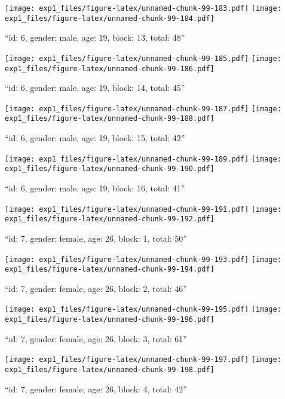 \documentclass[,]{article}
\begin{document}
\texttt{[image: exp1\_files/figure-latex/unnamed-chunk-99-183.pdf]}
\texttt{[image: exp1\_files/figure-latex/unnamed-chunk-99-184.pdf]}

\newpage
[1] 

``id: 6, gender: male, age: 19, block: 13, total: 48''

\texttt{[image: exp1\_files/figure-latex/unnamed-chunk-99-185.pdf]}
\texttt{[image: exp1\_files/figure-latex/unnamed-chunk-99-186.pdf]}

\newpage
[1] 

``id: 6, gender: male, age: 19, block: 14, total: 45''

\texttt{[image: exp1\_files/figure-latex/unnamed-chunk-99-187.pdf]}
\texttt{[image: exp1\_files/figure-latex/unnamed-chunk-99-188.pdf]}

\newpage
[1] 

``id: 6, gender: male, age: 19, block: 15, total: 42''

\texttt{[image: exp1\_files/figure-latex/unnamed-chunk-99-189.pdf]}
\texttt{[image: exp1\_files/figure-latex/unnamed-chunk-99-190.pdf]}

\newpage
[1] 

``id: 6, gender: male, age: 19, block: 16, total: 41''

\texttt{[image: exp1\_files/figure-latex/unnamed-chunk-99-191.pdf]}
\texttt{[image: exp1\_files/figure-latex/unnamed-chunk-99-192.pdf]}

\newpage
[1] 

``id: 7, gender: female, age: 26, block: 1, total: 50''

\texttt{[image: exp1\_files/figure-latex/unnamed-chunk-99-193.pdf]}
\texttt{[image: exp1\_files/figure-latex/unnamed-chunk-99-194.pdf]}

\newpage
[1] 

``id: 7, gender: female, age: 26, block: 2, total: 46''

\texttt{[image: exp1\_files/figure-latex/unnamed-chunk-99-195.pdf]}
\texttt{[image: exp1\_files/figure-latex/unnamed-chunk-99-196.pdf]}

\newpage
[1] 

``id: 7, gender: female, age: 26, block: 3, total: 61''

\texttt{[image: exp1\_files/figure-latex/unnamed-chunk-99-197.pdf]}
\texttt{[image: exp1\_files/figure-latex/unnamed-chunk-99-198.pdf]}

\newpage
[1] 

``id: 7, gender: female, age: 26, block: 4, total: 42''
\end{document}
